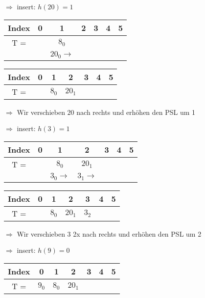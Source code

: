$\Rightarrow$ insert: $h(20)=1$
\begin{multicols}{2}
\begin{center}
\begin{tabular}{|c|c|c|c|c|c|c|}
\hline
Index & 0 & 1 & 2 & 3 & 4 & 5\\
\hline
T = & & $8_0$ & & & &\\
\hline
& & $20_0 \rightarrow$ & & & &\\
\hline
\end{tabular}
\end{center}


\columnbreak
\begin{center}
\begin{tabular}{|c|c|c|c|c|c|c|}
\hline
Index & 0 & 1 & 2 & 3 & 4 & 5\\
\hline
T = & & $8_0$ & $20_1$ & & &\\
\hline
\end{tabular}
\end{center}
$\Rightarrow$ Wir verschieben $20$ nach rechts und erhöhen den PSL um 1
\end{multicols}

$\Rightarrow$ insert: $h(3)=1$
\begin{multicols}{2}
\begin{center}
\begin{tabular}{|c|c|c|c|c|c|c|}
\hline
Index & 0 & 1 & 2 & 3 & 4 & 5\\
\hline
T = & & $8_0$ & $20_1$ & & &\\
\hline
& & $3_0 \rightarrow$ & $3_1 \rightarrow$& & &\\
\hline
\end{tabular}
\end{center}


\columnbreak
\begin{center}
\begin{tabular}{|c|c|c|c|c|c|c|}
\hline
Index & 0 & 1 & 2 & 3 & 4 & 5\\
\hline
T = & & $8_0$ & $20_1$ & $3_2$ & &\\
\hline
\end{tabular}
\end{center}
$\Rightarrow$ Wir verschieben $3$ 2x nach rechts und erhöhen den PSL um 2
\end{multicols}



$\Rightarrow$ insert: $h(9)=0$
\begin{center}
\begin{tabular}{|c|c|c|c|c|c|c|}
\hline
Index & 0 & 1 & 2 & 3 & 4 & 5\\
\hline
T = & $9_0$ & $8_0$ & $20_1$ & & &\\
\hline
\end{tabular}
\end{center}



